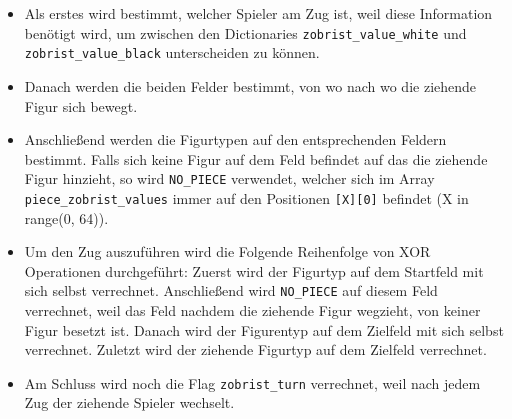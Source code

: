 \begin{itemize}
\tightlist
\item
  Als erstes wird bestimmt, welcher Spieler am Zug ist, weil diese
  Information benötigt wird, um zwischen den Dictionaries
  \texttt{zobrist\_value\_white} und \texttt{zobrist\_value\_black}
  unterscheiden zu können.
\item
  Danach werden die beiden Felder bestimmt, von wo nach wo die ziehende
  Figur sich bewegt.
\item
  Anschließend werden die Figurtypen auf den entsprechenden Feldern
  bestimmt. Falls sich keine Figur auf dem Feld befindet auf das die
  ziehende Figur hinzieht, so wird \texttt{NO\_PIECE} verwendet, welcher
  sich im Array \texttt{piece\_zobrist\_values} immer auf den Positionen
  \texttt{{[}X{]}{[}0{]}} befindet (X in range(0, 64)).
\item
  Um den Zug auszuführen wird die Folgende Reihenfolge von XOR
  Operationen durchgeführt: Zuerst wird der Figurtyp auf dem Startfeld
  mit sich selbst verrechnet. Anschließend wird \texttt{NO\_PIECE} auf
  diesem Feld verrechnet, weil das Feld nachdem die ziehende Figur
  wegzieht, von keiner Figur besetzt ist. Danach wird der Figurentyp auf
  dem Zielfeld mit sich selbst verrechnet. Zuletzt wird der ziehende
  Figurtyp auf dem Zielfeld verrechnet.
\item
  Am Schluss wird noch die Flag \texttt{zobrist\_turn} verrechnet, weil
  nach jedem Zug der ziehende Spieler wechselt.
\end{itemize}

\bigskip

